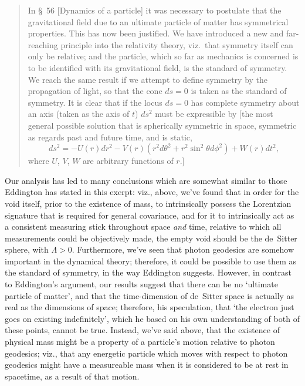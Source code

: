 \begin{quotation}
In \S~56 [Dynamics of a particle] it was necessary to postulate that the gravitational field due to an ultimate particle of matter has symmetrical properties. This has now been justified. We have introduced a new and far-reaching principle into the relativity theory, viz.~that symmetry itself can only be relative; and the particle, which so far as mechanics is concerned is to be identified with its gravitational field, is the standard of symmetry. We reach the same result if we attempt to define symmetry by the propagation of light, so that the cone $ds=0$ is taken as the standard of symmetry. It is clear that if the locus $ds=0$ has complete symmetry about an axis (taken as the axis of $t$) $ds^2$ must be expressible by [the most general possible solution that is spherically symmetric in space, symmetric as regards past and future time, and is static,
\begin{equation}
ds^2=-U(r)dr^2-V(r)(r^2d\theta^2+r^2\sin^2\theta{d\phi}^2)+W(r)dt^2,
\end{equation}
where $U$, $V$, $W$ are arbitrary functions of $r$.]
\end{quotation}

Our analysis has led to many conclusions which are somewhat similar to those Eddington has stated in this exerpt: viz., above, we've found that in order for the void itself, prior to the existence of mass, to intrinsically possess the Lorentzian signature that is required for general covariance, and for it to intrinsically act as a consistent measuring stick throughout space \textit{and} time, relative to which all measurements could be objectively made, the empty void should be the de~Sitter sphere, with $\Lambda>0$. Furthermore, we've seen that photon geodesics are somehow important in the dynamical theory; therefore, it could be possible to use them as the standard of symmetry, in the way Eddington suggests. However, in contrast to Eddington's argument, our results suggest that there can be no `ultimate particle of matter', and that the time-dimension of de~Sitter space is actually as real as the dimensions of space; therefore, his speculation, that `the electron just goes on existing indefinitely', which he based on his own understanding of both of these points, cannot be true. Instead, we've said above, that the existence of physical mass might be a property of a particle's motion relative to photon geodesics; viz., that any energetic particle which moves with respect to photon geodesics might have a measureable mass when it is considered to be at rest in spacetime, as a result of that motion. 

